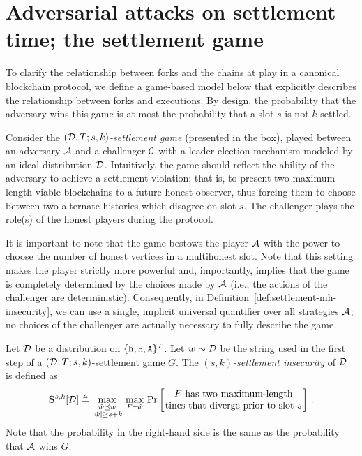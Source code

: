 \section[Attacks on Settlement]{Adversarial attacks on settlement time; the settlement game}\label{sec:game-mh} 


  To clarify the relationship between forks and the chains at play in a
  canonical blockchain protocol, we define a game-based model below that
  explicitly describes the relationship between forks and executions.
  By design, the probability that the adversary wins this game is at
  most the probability that a slot $s$ is not $k$-settled. 

  Consider the \emph{$(\mathcal{D},T;s,k)$-settlement game} 
  (presented in the box), played
  between an adversary $\mathcal{A}$ and a challenger $\mathcal{C}$ with
  a leader election mechanism modeled by an ideal distribution
  $\mathcal{D}$. Intuitively, the game should reflect the ability of
  the adversary to achieve a settlement violation; that is, to present
  two maximum-length viable blockchains to a future honest observer,
  thus forcing them to choose between two alternate histories which
  disagree on slot $s$.
  The challenger plays the role(s) of the honest players during the
  protocol. 

  It is important to note that the game bestows the player $\mathcal{A}$ 
  with the power to choose the number of honest vertices in 
  a multihonest slot. 
  Note that this setting makes the player strictly more powerful and, 
  importantly, implies that 
  the game is completely determined 
  by the choices made by $\mathcal{A}$ 
  (i.e., the actions of the challenger are deterministic). 
  Consequently, in Definition~\ref{def:settlement-mh-insecurity}, 
  we can use a single, implicit universal quantifier 
  over all strategies $\mathcal{A}$; no choices of the challenger are actually necessary to fully describe the game.


  \begin{definition}\label{def:settlement-mh-insecurity}
    Let $\mathcal{D}$ be a distribution on $\{\mathtt{h}, \mathtt{H}, \mathtt{A}\}^T$. 
    Let $w \sim \mathcal{D}$ be the string used in the 
    first step of a $(\mathcal{D}, T; s, k)$-settlement game $G$. 
    The \emph{$(s,k)$-settlement insecurity} of $\mathcal{D}$ 
    is defined as 
    \[
      \mathbf{S}^{s,k}[\Distribution] \triangleq 
        \max_{\substack{\hat{w} \PrefixEq w \\ |\hat{w}| \geq s + k}}\,
        \max_{F \Fork \hat{w}}\, 
        \Pr\left[\parbox{50mm}{\centering $F$ has two maximum-length tines that diverge prior to slot $s$}\right]
      \,.
    \]
    Note that the probability in the right-hand side is the same as 
    the probability that $\mathcal{A}$ wins $G$.
  \end{definition}

